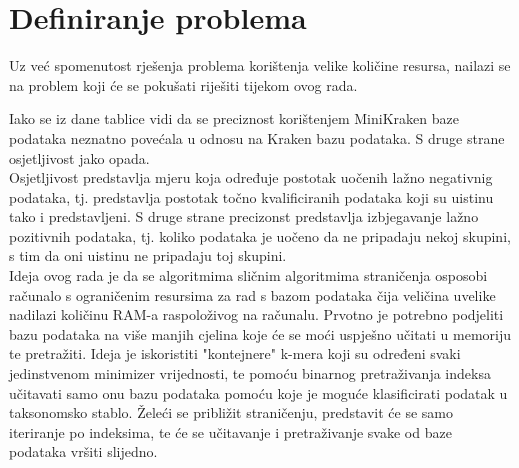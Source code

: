 \documentclass[times, utf8, zavrsni]{fer}
\begin{document}
{\chapter{Definiranje problema}
Uz već spomenutost rješenja problema korištenja velike količine resursa, nailazi se na problem koji će se pokušati riješiti tijekom ovog rada.
\begin{table}[hbp]
	\centering
	\caption{Isječak iz Tablice 1.1}
	\label{IsjecakTablice}
\end{table}

Iako se iz dane tablice vidi da se preciznost korištenjem MiniKraken baze podataka neznatno povećala u odnosu na Kraken bazu podataka. S druge strane osjetljivost jako opada. \\Osjetljivost predstavlja mjeru koja određuje postotak uočenih lažno negativnig podataka, tj. predstavlja postotak točno kvalificiranih podataka koji su uistinu tako i predstavljeni. S druge strane precizonst predstavlja izbjegavanje lažno pozitivnih podataka, tj. koliko podataka je uočeno da ne pripadaju nekoj skupini, s tim da oni uistinu ne pripadaju toj skupini.\\Ideja ovog rada je da se algoritmima sličnim algoritmima straničenja osposobi računalo s ograničenim resursima za rad s bazom podataka čija veličina uvelike nadilazi količinu RAM-a raspoloživog na računalu. Prvotno je potrebno podjeliti bazu podataka na više manjih cjelina koje će se moći uspješno učitati u memoriju te pretražiti. Ideja je iskoristiti "kontejnere" k-mera koji su određeni svaki jedinstvenom minimizer vrijednosti, te pomoću binarnog pretraživanja indeksa učitavati samo onu bazu podataka pomoću koje je moguće klasificirati podatak u taksonomsko stablo. Želeći se približit straničenju, predstavit će se samo iteriranje po indeksima, te će se učitavanje i pretraživanje svake od baze podataka vršiti slijedno.
}
\end{document}
